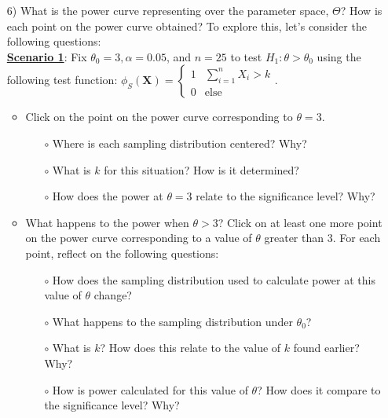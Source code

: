 \documentclass{TISE}
\begin{document}
\begin{enumerate}
	\item[6)] What is the power curve representing over the parameter space, $\Theta$? How is each point on the power curve obtained? To explore this, let's consider the following questions: \\
	
	\textbf{\underline{Scenario 1}}: Fix $\theta_0 = 3, \alpha = 0.05$, and $n = 25$ to test $H_1: \theta > \theta_0$ using the following test function: $\phi_S(\boldsymbol{X}) = \begin{cases}
	1 & \sum_{i=1}^n X_i > k \\ 0 & \text{else} \end{cases}$. 
	
	\begin{itemize}
		\item Click on the point on the power curve corresponding to $\theta = 3$. \\ 
		\begin{itemize}
			\item[$\circ$] Where is each sampling distribution centered? Why? \vspace{.5in}
			\item[$\circ$] What is $k$ for this situation? How is it determined? \vspace{.5in}
			\item[$\circ$] How does the power at $\theta = 3$ relate to the significance level? Why? \vspace{.5in}
		\end{itemize}
		\item What happens to the power when $\theta > 3$? Click on at least one more point on the power curve corresponding to a value of $\theta$ greater than 3. For each point, reflect on the following questions: \\
		\begin{itemize}
			\item[$\circ$] How does the sampling distribution used to calculate power at this value of $\theta$ change? \vspace{.5in}
			\item[$\circ$] What happens to the sampling distribution under $\theta_0$? \vspace{.5in}
			\item[$\circ$] What is $k$? How does this relate to the value of $k$ found earlier? Why? \vspace{.5in}
			\item[$\circ$] How is power calculated for this value of $\theta$? How does it compare to the significance level? Why? \vspace{.5in}

\end{itemize}
\end{itemize}
\end{enumerate}
\end{document}
